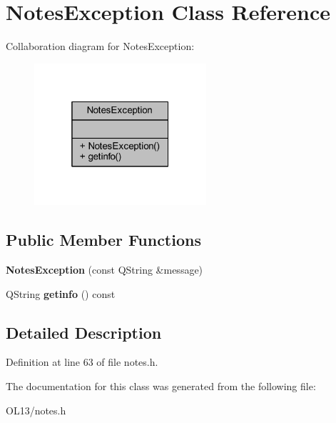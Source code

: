 \hypertarget{class_notes_exception}{}\section{Notes\+Exception Class Reference}
\label{class_notes_exception}


Collaboration diagram for Notes\+Exception\+:
\nopagebreak
\begin{figure}[H]
\begin{center}
\leavevmode
\includegraphics[width=181pt]{class_notes_exception__coll__graph}
\end{center}
\end{figure}
\subsection*{Public Member Functions}
\begin{DoxyCompactItemize}
\item 
\mbox{\label{class_notes_exception_af10aca61d1cb993b62e868f0fe9bf144}} 
{\bfseries Notes\+Exception} (const Q\+String \&message)
\item 
\mbox{\label{class_notes_exception_aaa70b4b237c0fcadf5426848b54da15e}} 
Q\+String {\bfseries getinfo} () const
\end{DoxyCompactItemize}


\subsection{Detailed Description}


Definition at line 63 of file notes.\+h.



The documentation for this class was generated from the following file\+:\begin{DoxyCompactItemize}
\item 
O\+L13/notes.\+h\end{DoxyCompactItemize}
